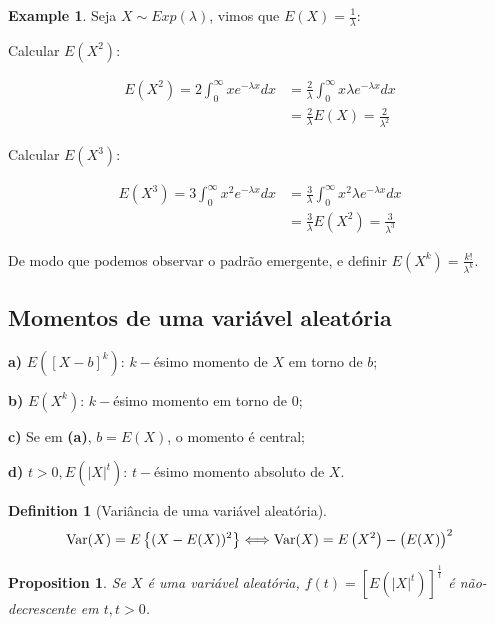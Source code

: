 \documentclass[
]{article}
\newtheorem{proposition}{Proposition}[section]
\theoremstyle{definition}
\newtheorem{definition}{Definition}[section]
\theoremstyle{definition}
\newtheorem{example}{Example}[section]
\theoremstyle{definition}
\theoremstyle{definition}
\theoremstyle{remark}
\begin{document}
\begin{example}
Seja \(X \sim Exp(\lambda)\), vimos que \(E(X) = \frac{1}{\lambda}\):

Calcular \(E(X^{2})\):

\begin{align*}
E(X^{2}) = 2\int_{0}^{\infty}xe^{-\lambda x}dx &= \frac{2}{\lambda}\int_{0}^{\infty}x\lambda e^{-\lambda x}dx \\
&= \frac{2}{\lambda}E(X) = \frac{2}{\lambda^{2}}
\end{align*}

Calcular \(E(X^{3})\):

\begin{align*}
E(X^{3}) = 3\int_{0}^{\infty}x^{2}e^{-\lambda x}dx &= \frac{3}{\lambda}\int_{0}^{\infty}x^{2}\lambda e^{-\lambda x}dx \\
&= \frac{3}{\lambda}E(X^{2}) = \frac{3}{\lambda^{3}}
\end{align*}

De modo que podemos observar o padrão emergente, e definir \(E(X^{k}) = \frac{k!}{\lambda^{k}}\).
\end{example}

\hypertarget{momentos-de-uma-variuxe1vel-aleatuxf3ria}{%
\subsection{Momentos de uma variável aleatória}\label{momentos-de-uma-variuxe1vel-aleatuxf3ria}}

\textbf{a)} \(E\left(\left[X - b\right]^{k}\right)\): \(k-\)ésimo momento de \(X\) em torno de \(b\);

\textbf{b)} \(E\left(X^{k}\right)\): \(k-\)ésimo momento em torno de 0;

\textbf{c)} Se em \textbf{(a)}, \(b = E(X)\), o momento é central;

\textbf{d)} \(t>0,E\left(|X|^{t}\right)\): \(t-\)ésimo momento absoluto de \(X\).

\begin{definition}[Variância de uma variável aleatória]
\protect\hypertarget{def:Variancia}{}\label{def:Variancia}\begin{equation*}
\mathrm{Var}(X) = E\left\{(X - E(X))^{2}\right\} \Longleftrightarrow \mathrm{Var}(X) = E\left(X^{2}\right) - \big{(}E(X)\big{)}^{2}
\end{equation*}
\end{definition}

\begin{proposition}
Se \(X\) é uma variável aleatória, \(f(t) = \left[E(|X|^{t})\right]^{\frac{1}{t}}\) é não-decrescente em \(t, t >0\).
\end{proposition}
\end{document}
